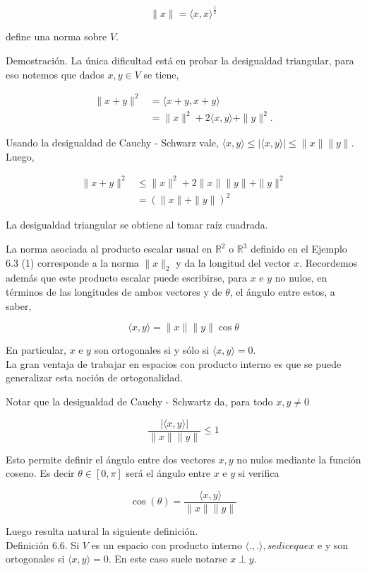 \documentclass[10pt]{book}
\begin{document}
$$
\|x\|=\langle x, x\rangle^{\frac{1}{2}}
$$

define una norma sobre $V$.

Demostración. La única dificultad está en probar la desigualdad triangular, para eso notemos que dados $x, y \in V$ se tiene,

$$
\begin{aligned}
\|x+y\|^{2} & =\langle x+y, x+y\rangle \\
& =\|x\|^{2}+2\langle x, y\rangle+\|y\|^{2} .
\end{aligned}
$$

Usando la desigualdad de Cauchy - Schwarz vale, $\langle x, y\rangle \leq|\langle x, y\rangle| \leq\|x\|\|y\|$. Luego,

$$
\begin{aligned}
\|x+y\|^{2} & \leq\|x\|^{2}+2\|x\|\|y\|+\|y\|^{2} \\
& =(\|x\|+\|y\|)^{2}
\end{aligned}
$$

La desigualdad triangular se obtiene al tomar raíz cuadrada.

La norma asociada al producto escalar usual en $\mathbb{R}^{2}$ o $\mathbb{R}^{3}$ definido en el Ejemplo 6.3 (1) corresponde a la norma $\|x\|_{2}$ y da la longitud del vector $x$. Recordemos además que este producto escalar puede escribirse, para $x$ e $y$ no nulos, en términos de las longitudes de ambos vectores y de $\theta$, el ángulo entre estos, a saber,

$$
\langle x, y\rangle=\|x\|\|y\| \cos \theta
$$

En particular, $x$ e $y$ son ortogonales si y sólo si $\langle x, y\rangle=0$.\\
La gran ventaja de trabajar en espacios con producto interno es que se puede generalizar esta noción de ortogonalidad.

Notar que la desigualdad de Cauchy - Schwartz da, para todo $x, y \neq 0$

$$
\frac{|\langle x, y\rangle|}{\|x\|\|y\|} \leq 1
$$

Esto permite definir el ángulo entre dos vectores $x, y$ no nulos mediante la función coseno. Es decir $\theta \in[0, \pi]$ será el ángulo entre $x$ e $y$ si verifica

$$
\cos (\theta)=\frac{\langle x, y\rangle}{\|x\|\|y\|}
$$

Luego resulta natural la siguiente definición.\\
Definición 6.6. Si $V$ es un espacio con producto interno $\langle.,$.$\rangle , se dice que x$ e y son ortogonales si $\langle x, y\rangle=0$. En este caso suele notarse $x \perp y$.
\end{document}
